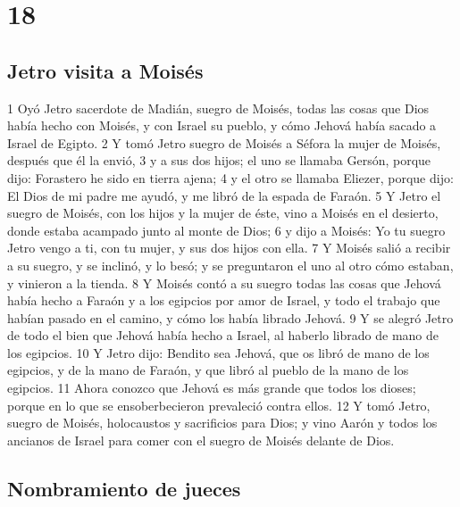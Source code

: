 \chapter{18}

\section*{Jetro visita a Moisés}

1 Oyó Jetro sacerdote de Madián, suegro de Moisés, todas las cosas que Dios había hecho con Moisés, y con Israel su pueblo, y cómo Jehová había sacado a Israel de Egipto.
2 Y tomó Jetro suegro de Moisés a Séfora la mujer de Moisés, después que él la envió,
3 y a sus dos hijos; el uno se llamaba Gersón, porque dijo: Forastero he sido en tierra ajena;
4 y el otro se llamaba Eliezer, porque dijo: El Dios de mi padre me ayudó, y me libró de la espada de Faraón.
5 Y Jetro el suegro de Moisés, con los hijos y la mujer de éste, vino a Moisés en el desierto, donde estaba acampado junto al monte de Dios;
6 y dijo a Moisés: Yo tu suegro Jetro vengo a ti, con tu mujer, y sus dos hijos con ella.
7 Y Moisés salió a recibir a su suegro, y se inclinó, y lo besó; y se preguntaron el uno al otro cómo estaban, y vinieron a la tienda.
8 Y Moisés contó a su suegro todas las cosas que Jehová había hecho a Faraón y a los egipcios por amor de Israel, y todo el trabajo que habían pasado en el camino, y cómo los había librado Jehová.
9 Y se alegró Jetro de todo el bien que Jehová había hecho a Israel, al haberlo librado de mano de los egipcios.
10 Y Jetro dijo: Bendito sea Jehová, que os libró de mano de los egipcios, y de la mano de Faraón, y que libró al pueblo de la mano de los egipcios.
11 Ahora conozco que Jehová es más grande que todos los dioses; porque en lo que se ensoberbecieron prevaleció contra ellos.
12 Y tomó Jetro, suegro de Moisés, holocaustos y sacrificios para Dios; y vino Aarón y todos los ancianos de Israel para comer con el suegro de Moisés delante de Dios.

\section*{Nombramiento de jueces}

